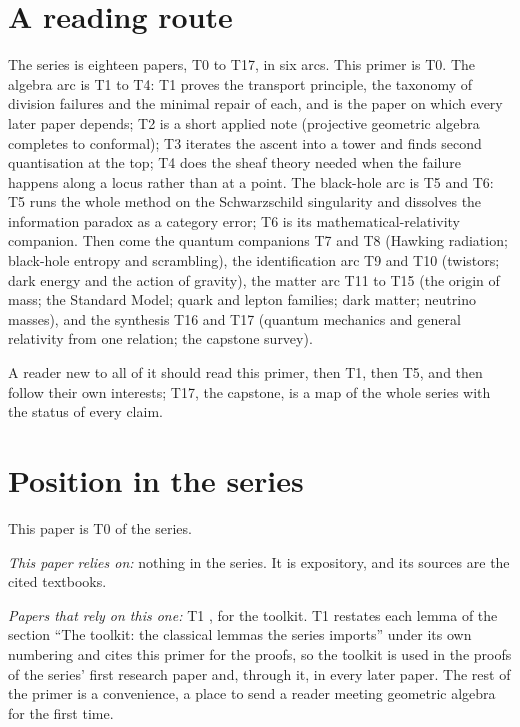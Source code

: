 \documentclass[11pt]{article}
\theoremstyle{definition}
\theoremstyle{plain}
\begin{document}
\section{A reading route}

\label{c:note.primer.setting-reading-route}
The series is eighteen papers, T0 to T17, in six arcs. This primer is T0. The algebra arc is T1 to T4: T1 proves the transport principle, the taxonomy of division failures and the minimal repair of each, and is the paper on which every later paper depends; T2 is a short applied note (projective geometric algebra completes to conformal); T3 iterates the ascent into a tower and finds second quantisation at the top; T4 does the sheaf theory needed when the failure happens along a locus rather than at a point. The black-hole arc is T5 and T6: T5 runs the whole method on the Schwarzschild singularity and dissolves the information paradox as a category error; T6 is its mathematical-relativity companion. Then come the quantum companions T7 and T8 (Hawking radiation; black-hole entropy and scrambling), the identification arc T9 and T10 (twistors; dark energy and the action of gravity), the matter arc T11 to T15 (the origin of mass; the Standard Model; quark and lepton families; dark matter; neutrino masses), and the synthesis T16 and T17 (quantum mechanics and general relativity from one relation; the capstone survey).

A reader new to all of it should read this primer, then T1, then T5, and then follow their own interests; T17, the capstone, is a map of the whole series with the status of every claim.

\section{Position in the series}

\label{c:note.primer.setting-position-series}
This paper is T0 of the series.

\emph{This paper relies on:} nothing in the series. It is expository, and its sources are the cited textbooks.

\emph{Papers that rely on this one:} T1 \cite{ButlerT1}, for the toolkit. T1 \cite{ButlerT1} restates each lemma of the section ``The toolkit: the classical lemmas the series imports'' under its own numbering and cites this primer for the proofs, so the toolkit is used in the proofs of the series' first research paper and, through it, in every later paper. The rest of the primer is a convenience, a place to send a reader meeting geometric algebra for the first time.
\end{document}
